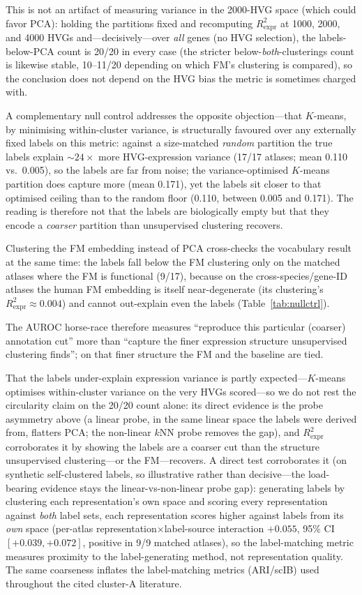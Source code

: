 \documentclass[11pt]{article}
\begin{document}
This is not an artifact of measuring variance in the 2000-HVG space (which could favor PCA): holding the partitions fixed and recomputing $R^2_{\mathrm{expr}}$ at 1000, 2000, and 4000 HVGs and---decisively---over \emph{all} genes (no HVG selection), the labels-below-PCA count is 20/20 in every case (the stricter below-\emph{both}-clusterings count is likewise stable, 10--11/20 depending on which FM's clustering is compared), so the conclusion does not depend on the HVG bias the metric is sometimes charged with.

A complementary null control addresses the opposite objection---that $K$-means, by minimising within-cluster variance, is structurally favoured over any externally fixed labels on this metric: against a size-matched \emph{random} partition the true labels explain ${\sim}24\times$ more HVG-expression variance (17/17 atlases; mean 0.110 vs.\ 0.005), so the labels are far from noise; the variance-optimised $K$-means partition does capture more (mean 0.171), yet the labels sit closer to that optimised ceiling than to the random floor (0.110, between 0.005 and 0.171). The reading is therefore not that the labels are biologically empty but that they encode a \emph{coarser} partition than unsupervised clustering recovers.

Clustering the FM embedding instead of PCA cross-checks the vocabulary result at the same time: the labels fall below the FM clustering only on the matched atlases where the FM is functional (9/17), because on the cross-species/gene-ID atlases the human FM embedding is itself near-degenerate (its clustering's $R^2_{\mathrm{expr}}\!\approx\!0.004$) and cannot out-explain even the labels (Table~\ref{tab:nullctrl}).

The AUROC horse-race therefore measures ``reproduce this particular (coarser) annotation cut'' more than ``capture the finer expression structure unsupervised clustering finds''; on that finer structure the FM and the baseline are tied.

That the labels under-explain expression variance is partly expected---$K$-means optimises within-cluster variance on the very HVGs scored---so we do not rest the circularity claim on the 20/20 count alone: its direct evidence is the probe asymmetry above (a linear probe, in the same linear space the labels were derived from, flatters PCA; the non-linear $k$NN probe removes the gap), and $R^2_{\mathrm{expr}}$ corroborates it by showing the labels are a coarser cut than the structure unsupervised clustering---or the FM---recovers. A direct test corroborates it (on synthetic self-clustered labels, so illustrative rather than decisive---the load-bearing evidence stays the linear-vs-non-linear probe gap): generating labels by clustering each representation's own space and scoring every representation against \emph{both} label sets, each representation scores higher against labels from its \emph{own} space (per-atlas representation$\times$label-source interaction $+0.055$, 95\% CI $[+0.039,+0.072]$, positive in 9/9 matched atlases), so the label-matching metric measures proximity to the label-generating method, not representation quality. The same coarseness inflates the label-matching metrics (ARI/scIB) used throughout the cited cluster-A literature.
\end{document}
